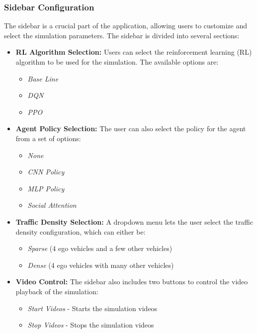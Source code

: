 \subsubsection{Sidebar Configuration}

The sidebar is a crucial part of the application, allowing users to customize and select the simulation parameters. The sidebar is divided into several sections:

\begin{itemize}
    \item \textbf{RL Algorithm Selection:} 
    Users can select the reinforcement learning (RL) algorithm to be used for the simulation. The available options are:
    \begin{itemize}
        \item \textit{Base Line}
        \item \textit{DQN}
        \item \textit{PPO}
    \end{itemize}

    \item \textbf{Agent Policy Selection:} 
    The user can also select the policy for the agent from a set of options:
    \begin{itemize}
        \item \textit{None} 
        \item \textit{CNN Policy}
        \item \textit{MLP Policy}
        \item \textit{Social Attention}
    \end{itemize}
    
    \item \textbf{Traffic Density Selection:} 
    A dropdown menu lets the user select the traffic density configuration, which can either be:
    \begin{itemize}
        \item \textit{Sparse} (4 ego vehicles and a few other vehicles)
        \item \textit{Dense} (4 ego vehicles with many other vehicles)
    \end{itemize}

    \item \textbf{Video Control:} 
    The sidebar also includes two buttons to control the video playback of the simulation:
    \begin{itemize}
        \item \textit{Start Videos} - Starts the simulation videos
        \item \textit{Stop Videos} - Stops the simulation videos
    \end{itemize}
\end{itemize}

